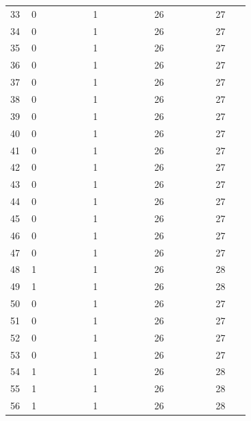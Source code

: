 \documentclass[11pt]{article}
\begin{document}
\begin{longtable}{@{}p{0.08\linewidth}p{0.23\linewidth}p{0.23\linewidth}p{0.23\linewidth}p{0.13\linewidth}@{}}
33 & 0 & 1 & 26 & 27 \\
34 & 0 & 1 & 26 & 27 \\
35 & 0 & 1 & 26 & 27 \\
36 & 0 & 1 & 26 & 27 \\
37 & 0 & 1 & 26 & 27 \\
38 & 0 & 1 & 26 & 27 \\
39 & 0 & 1 & 26 & 27 \\
40 & 0 & 1 & 26 & 27 \\
41 & 0 & 1 & 26 & 27 \\
42 & 0 & 1 & 26 & 27 \\
43 & 0 & 1 & 26 & 27 \\
44 & 0 & 1 & 26 & 27 \\
45 & 0 & 1 & 26 & 27 \\
46 & 0 & 1 & 26 & 27 \\
47 & 0 & 1 & 26 & 27 \\
48 & 1 & 1 & 26 & 28 \\
49 & 1 & 1 & 26 & 28 \\
50 & 0 & 1 & 26 & 27 \\
51 & 0 & 1 & 26 & 27 \\
52 & 0 & 1 & 26 & 27 \\
53 & 0 & 1 & 26 & 27 \\
54 & 1 & 1 & 26 & 28 \\
55 & 1 & 1 & 26 & 28 \\
56 & 1 & 1 & 26 & 28 \\
\end{longtable}
\endgroup
\end{document}

